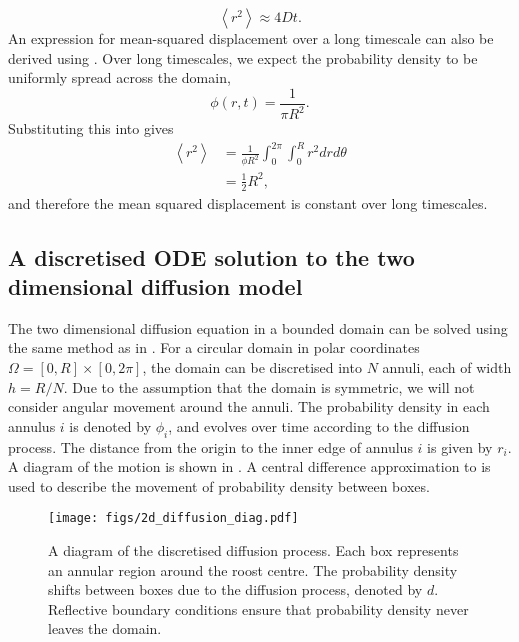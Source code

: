 %
\begin{equation}
\left<r^2\right> \approx 4Dt.
\label{eqn:diffusion_short}
\end{equation}
%
An expression for mean-squared displacement over a long timescale can also be derived using . Over long timescales, we expect the probability density to be uniformly spread across the domain,
%
\begin{equation}
\phi(r,t) = \frac{1}{\pi R^2} .
\end{equation}
%
Substituting this into  gives
%
\begin{align}
\left<r^2\right> &= \frac{1}{\phi R^2}\int_{0}^{2\pi} \int_{0}^{R} r^2 dr d\theta \\
&= \frac{1}{2} R^2,
\end{align}
%
and therefore the mean squared displacement is constant over long timescales.

\subsection{A discretised ODE solution to the two dimensional diffusion model}

The two dimensional diffusion equation in a bounded domain can be solved using the same method as in . For a circular domain in polar coordinates $\Omega = [0,R] \times [0, 2\pi]$, the domain can be discretised into $N$ annuli, each of
width $h=R/N$. Due to the assumption that the domain is symmetric, we will not consider angular movement around the annuli. The probability density in each annulus $i$ is denoted by $\phi_i$, and evolves over time according to the diffusion process.  The distance from the origin to the inner edge of annulus $i$ is given by $r_i$. A diagram of the motion is shown in . A central difference approximation to  is used to describe the movement of probability density between boxes.

\begin{figure}
\centering
    \texttt{[image: figs/2d\_diffusion\_diag.pdf]}
    \caption{A diagram of the discretised diffusion process. Each box represents an annular region around the roost centre. The probability density shifts between boxes due to the diffusion process, denoted by $d$. Reflective boundary conditions ensure that probability density never leaves the domain.}
\label{fig:2d_diffusion_diag}
\end{figure}

